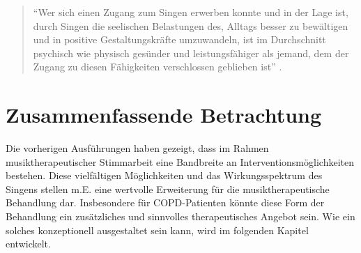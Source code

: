 \begin{quote}
\onehalfspacing
"`Wer sich einen Zugang zum Singen erwerben konnte und in der Lage ist, durch Singen die seelischen Belastungen des, Alltags besser zu bewältigen und in positive Gestaltungskräfte umzuwandeln, ist im Durchschnitt psychisch wie physisch gesünder und leistungsfähiger als jemand, dem der Zugang zu diesen Fähigkeiten verschlossen geblieben ist"' \autocite[93ff.]{adamek1997}. 
\end{quote}

\section{Zusammenfassende Betrachtung}
Die vorherigen Ausführungen haben gezeigt, dass im Rahmen musiktherapeutischer Stimmarbeit eine Bandbreite an Interventionsmöglichkeiten bestehen. Diese vielfältigen Möglichkeiten und das Wirkungsspektrum des Singens stellen m.E. eine wertvolle Erweiterung für die musiktherapeutische Behandlung dar. Insbesondere für COPD-Patienten könnte diese Form der Behandlung ein zusätzliches und sinnvolles therapeutisches Angebot sein. Wie ein solches konzeptionell ausgestaltet sein kann, wird im folgenden Kapitel entwickelt.



\newpage\thispagestyle{empty}

